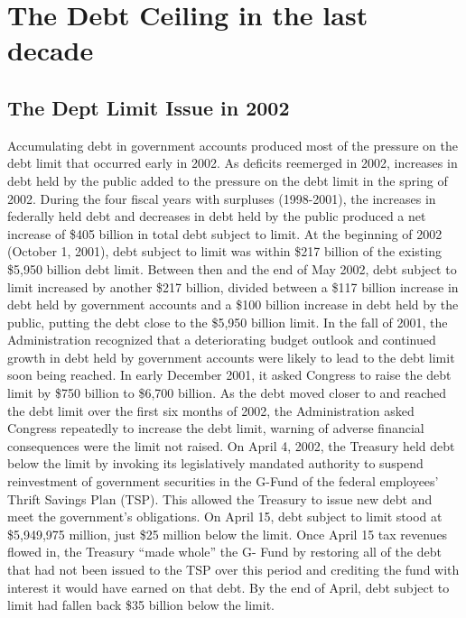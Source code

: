 \section{The Debt Ceiling in the last decade}
\label{sec:LastDecade}

\subsection{The Dept Limit Issue in 2002}
Accumulating debt in government accounts produced most of the pressure on the debt limit that occurred early in 2002. As deficits reemerged in 2002, increases in debt held by the public added to the pressure on the debt limit in the spring of 2002. During the four fiscal years with surpluses (1998-2001), the increases in federally held debt and decreases in debt held by the public produced a net increase of \$405 billion in total debt subject to limit. At the beginning of 2002 (October 1, 2001), debt subject to limit was within \$217 billion of the existing \$5,950 billion debt limit. Between then and the end of May 2002, debt subject to limit increased by another \$217 billion, divided between a \$117 billion increase in debt held by government accounts and a \$100 billion increase in debt held by the public, putting the debt close to the \$5,950 billion limit. 
\newline \newline
In the fall of 2001, the Administration recognized that a deteriorating budget outlook and continued growth in debt held by government accounts were likely to lead to the debt limit soon being reached. In early December 2001, it asked Congress to raise the debt limit by \$750 billion to \$6,700 billion. As the debt moved closer to and reached the debt limit over the first six months of 2002, the Administration asked Congress repeatedly to increase the debt limit, warning of adverse financial consequences were the limit not raised.
\newline \newline
On April 4, 2002, the Treasury held debt below the limit by invoking its legislatively mandated authority to suspend reinvestment of government securities in the G-Fund of the federal employees’ Thrift Savings Plan (TSP). This allowed the Treasury to issue new debt and meet the government’s obligations. On April 15, debt subject to limit stood at \$5,949,975 million, just \$25 million below the limit. Once April 15 tax revenues flowed in, the Treasury “made whole” the G- Fund by restoring all of the debt that had not been issued to the TSP over this period and crediting the fund with interest it would have earned on that debt. By the end of April, debt subject to limit had fallen back \$35 billion below the limit.
\newline \newline

